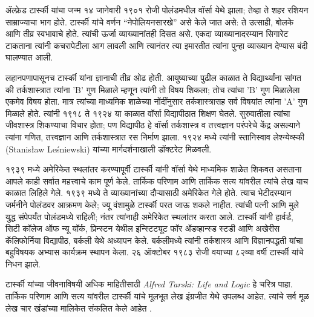 \documentclass[../../../include/open-logic-section]{subfiles}
\begin{document}



ॲल्फ्रेड टार्स्की यांचा जन्म १४ जानेवारी १९०१ रोजी पोलंडमधील वॉर्सा येथे झाला; तेव्हा ते शहर रशियन साम्राज्याचा भाग होते. टार्स्की यांचे वर्णन “नेपोलियनसारखे” असे केले जात असे: ते उत्साही, बोलके आणि तीव्र स्वभावाचे होते. त्यांची ऊर्जा व्याख्यानांतही दिसत असे. एकदा व्याख्यानादरम्यान सिगारेट टाकताना त्यांनी कचरापेटीला आग लावली आणि त्यानंतर त्या इमारतीत त्यांना पुन्हा व्याख्यान देण्यास बंदी घालण्यात आली.

लहानपणापासूनच टार्स्की यांना ज्ञानाची तीव्र ओढ होती. आयुष्याच्या पुढील काळात ते विद्यार्थ्यांना सांगत की तर्कशास्त्रात त्यांना 'B' गुण मिळाले म्हणून त्यांनी तो विषय शिकला; तोच त्यांचा 'B' गुण मिळालेला एकमेव विषय होता. मात्र त्यांच्या माध्यमिक शाळेच्या नोंदींनुसार तर्कशास्त्रासह सर्व विषयांत त्यांना 'A' गुण मिळाले होते. त्यांनी १९१८ ते १९२४ या काळात वॉर्सा विद्यापीठात शिक्षण घेतले. सुरुवातीला त्यांचा जीवशास्त्र शिकण्याचा विचार होता; पण विद्यापीठ हे वॉर्सा तर्कशास्त्र व तत्त्वज्ञान परंपरेचे केंद्र असल्याने त्यांना गणित, तत्त्वज्ञान आणि तर्कशास्त्रात रस निर्माण झाला. १९२४ मध्ये त्यांनी स्तानिस्वाव लेश्न्येव्स्की (Stanis\l{}aw Le\'{s}niewski) यांच्या मार्गदर्शनाखाली डॉक्टरेट मिळवली.

१९३९ मध्ये अमेरिकेत स्थलांतर करण्यापूर्वी टार्स्की यांनी वॉर्सा येथे माध्यमिक शाळेत शिकवत असताना आपले काही सर्वात महत्त्वाचे काम पूर्ण केले. तार्किक परिणाम आणि तार्किक सत्य यांवरील त्यांचे लेख याच काळात लिहिले गेले. १९३९ मध्ये ते व्याख्यानांच्या दौऱ्यासाठी अमेरिकेत गेले होते. त्याच भेटीदरम्यान जर्मनीने पोलंडवर आक्रमण केले; ज्यू वंशामुळे टार्स्की परत जाऊ शकले नाहीत. त्यांची पत्नी आणि मुले युद्ध संपेपर्यंत पोलंडमध्ये राहिली; नंतर त्यांनाही अमेरिकेत स्थलांतर करता आले. टार्स्की यांनी हार्वर्ड, सिटी कॉलेज ऑफ न्यू यॉर्क, प्रिन्स्टन येथील इन्स्टिट्यूट फॉर ॲडव्हान्स्ड स्टडी आणि अखेरीस कॅलिफोर्निया विद्यापीठ, बर्कली येथे अध्यापन केले. बर्कलीमध्ये त्यांनी तर्कशास्त्र आणि विज्ञानपद्धती यांचा बहुविषयक अभ्यास कार्यक्रम स्थापन केला. २६ ऑक्टोबर १९८३ रोजी वयाच्या ८२व्या वर्षी टार्स्की यांचे निधन झाले.

\begin{reading}
टार्स्की यांच्या जीवनाविषयी अधिक माहितीसाठी \emph{Alfred Tarski: Life
  and Logic} हे चरित्र \citep{Feferman2004} पाहा. तार्किक परिणाम आणि सत्य यांवरील टार्स्की यांचे मूलभूत लेख इंग्रजीत \citep{Tarski1983} येथे उपलब्ध आहेत. त्यांचे सर्व मूळ लेख चार खंडांच्या मालिकेत संकलित केले आहेत \citep{Tarski1981}.
\end{reading}
\end{document}

